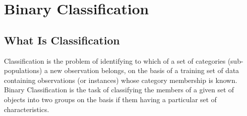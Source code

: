 \documentclass[]{report}
\begin{document}

\section*{Binary Classification}
\subsection*{What Is Classification}
Classification is the problem of identifying to which of a set of categories
(sub-populations) a new observation belongs, on the basis of a training set
of data containing observations (or instances) whose category membership is
known. Binary Classification is the task of classifying the members of a given set of objects into two groups on the basis
if them having a particular set of characteristics.
\end{document}

